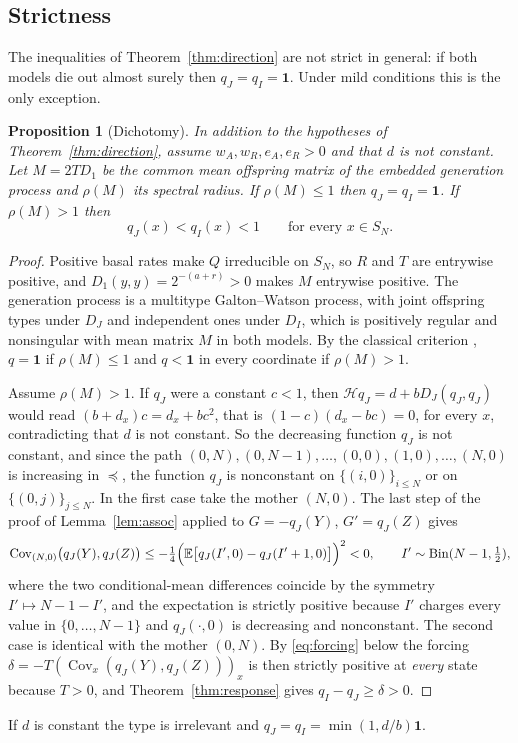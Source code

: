 \documentclass[11pt]{article}
\newtheorem{proposition}[theorem]{Proposition}
\theoremstyle{remark}
\newcommand{\one}{\mathbf 1}
\newcommand{\E}{\mathbb E}
\newcommand{\Cov}{\operatorname{Cov}}
\newcommand{\Hm}{\mathcal H}
\newcommand{\Bin}{\operatorname{Bin}}
\begin{document}
\subsection{Strictness}
The inequalities of Theorem~\ref{thm:direction} are not strict in general:
if both models die out almost surely then $q_J=q_I=\one$. Under mild
conditions this is the only exception.

\begin{proposition}[Dichotomy]\label{prop:strict}
In addition to the hypotheses of Theorem~\ref{thm:direction}, assume
$w_A,w_R,e_A,e_R>0$ and that $d$ is not constant. Let $M=2TD_1$ be the common
mean offspring matrix of the embedded generation process and $\rho(M)$ its
spectral radius. If $\rho(M)\le1$ then $q_J=q_I=\one$. If $\rho(M)>1$ then
\[
 q_J(x)<q_I(x)<1\qquad\text{for every }x\in S_N .
\]
\end{proposition}
\begin{proof}
Positive basal rates make $Q$ irreducible on $S_N$, so $R$ and $T$ are
entrywise positive, and $D_1(y,y)=2^{-(a+r)}>0$ makes $M$ entrywise positive.
The generation process is a multitype Galton--Watson process, with joint
offspring types under $D_J$ and independent ones under $D_I$, which is
positively regular and nonsingular with mean matrix $M$ in both models. By the
classical criterion \cite[Ch.~V.3]{athreya1972}, $q=\one$ if $\rho(M)\le1$
and $q<\one$ in every coordinate if $\rho(M)>1$.

Assume $\rho(M)>1$. If $q_J$ were a constant $c<1$, then
$\Hm q_J=d+bD_J(q_J,q_J)$ would read $(b+d_x)c=d_x+bc^2$, that is
$(1-c)(d_x-bc)=0$, for every $x$, contradicting that $d$ is not constant. So
the decreasing function $q_J$ is not constant, and since the path
$(0,N),(0,N-1),\dots,(0,0),(1,0),\dots,(N,0)$ is increasing in $\preceq$,
the function $q_J$ is nonconstant on $\{(i,0)\}_{i\le N}$ or on
$\{(0,j)\}_{j\le N}$. In the first case take the mother $(N,0)$. The last
step of the proof of Lemma~\ref{lem:assoc} applied to $G=-q_J(Y)$,
$G'=q_J(Z)$ gives
\[
 \Cov_{(N,0)}\bigl(q_J(Y),q_J(Z)\bigr)\le-\tfrac14\Bigl(\E\bigl[q_J(I',0)-q_J(I'+1,0)\bigr]\Bigr)^2<0,
 \qquad I'\sim\Bin(N-1,\tfrac12),
\]
where the two conditional-mean differences coincide by the symmetry
$I'\mapsto N-1-I'$, and the expectation is strictly positive because $I'$
charges every value in $\{0,\dots,N-1\}$ and $q_J(\cdot,0)$ is decreasing and
nonconstant. The second case is identical with the mother $(0,N)$. By
\eqref{eq:forcing} below the forcing
$\delta=-T(\Cov_x(q_J(Y),q_J(Z)))_x$ is then strictly positive at
\emph{every} state because $T>0$, and
Theorem~\ref{thm:response} gives $q_I-q_J\ge\delta>0$.
\end{proof}
If $d$ is constant the type is irrelevant and $q_J=q_I=\min(1,d/b)\one$.
\end{document}

